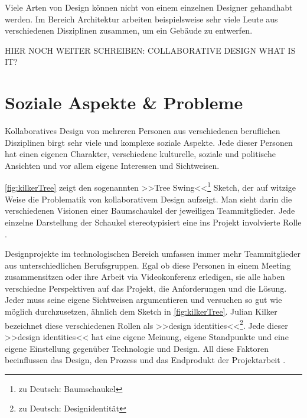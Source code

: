 Viele Arten von Design können nicht von einem einzelnen Designer gehandhabt werden. Im Bereich Architektur arbeiten beispielsweise sehr viele Leute aus verschiedenen Disziplinen zusammen, um ein Gebäude zu entwerfen. 

HIER NOCH WEITER SCHREIBEN: COLLABORATIVE DESIGN WHAT IS IT?

\section{Soziale Aspekte \& Probleme} 

Kollaboratives Design von mehreren Personen aus verschiedenen beruflichen Disziplinen birgt sehr viele und komplexe soziale Aspekte. Jede dieser Personen hat einen eigenen Charakter, verschiedene kulturelle, soziale und politische Ansichten und vor allem eigene Interessen und Sichtweisen.

\autoref{fig:kilkerTree} zeigt den sogenannten >>Tree Swing<<\footnote{zu Deutsch: Baumschaukel} Sketch, der auf witzige Weise die Problematik von kollaborativem Design aufzeigt. Man sieht darin die verschiedenen Visionen einer Baumschaukel der jeweiligen Teammitglieder. Jede einzelne Darstellung der Schaukel stereotypisiert eine ins Projekt involvierte Rolle \citep{Kilker:1999}.

\medskip Designprojekte im technologischen Bereich umfassen immer mehr Teammitglieder aus unterschiedlichen Berufsgruppen. Egal ob diese Personen in einem Meeting zusammensitzen oder ihre Arbeit via Videokonferenz erledigen, sie alle haben verschiedne Perspektiven auf das Projekt, die Anforderungen und die Lösung. Jeder muss seine eigene Sichtweisen argumentieren und versuchen so gut wie möglich durchzusetzen, ähnlich dem Sketch in \autoref{fig:kilkerTree}. Julian Kilker bezeichnet diese verschiedenen Rollen als >>design identities<<\footnote{zu Deutsch: Designidentität}. Jede dieser >>design identities<< hat eine eigene Meinung, eigene Standpunkte und eine eigene Einstellung gegenüber Technologie und Design. All diese Faktoren beeinflussen das Design, den Prozess und das Endprodukt der Projektarbeit \citep{Kilker:1999}.

